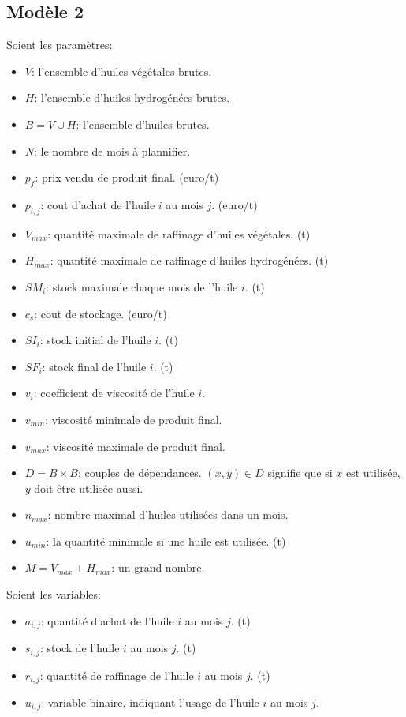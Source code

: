 \documentclass[10pt,a4paper]{article}
\begin{document}
\subsection{Modèle 2}
Soient les paramètres:
\begin{itemize}
    \item $V$: l'ensemble d'huiles végétales brutes.
    \item $H$: l'ensemble d'huiles hydrogénées brutes.
    \item $B = V \cup H$: l'ensemble d'huiles brutes.
    \item $N$: le nombre de mois à plannifier.
    \item $p_f$: prix vendu de produit final. (euro/t)
    \item $p_{i,j}$: cout d'achat de l'huile $i$ au mois $j$. (euro/t)
    \item $V_{max}$: quantité maximale de raffinage d'huiles végétales. (t)
    \item $H_{max}$: quantité maximale de raffinage d'huiles hydrogénées. (t)
    \item $SM_i$: stock maximale chaque mois de l'huile $i$. (t)
    \item $c_s$: cout de stockage. (euro/t)
    \item $SI_i$: stock initial de l'huile $i$. (t)
    \item $SF_i$: stock final de l'huile $i$. (t)
    \item $v_i$: coefficient de viscosité de l'huile $i$.
    \item $v_{min}$: viscosité minimale de produit final.
    \item $v_{max}$: viscosité maximale de produit final.
    \item $D = B \times B$: couples de dépendances. $(x, y) \in D$ signifie que si $x$ est utilisée, $y$ doit être utilisée aussi.
    \item $n_{max}$: nombre maximal d'huiles utilisées dans un mois.
    \item $u_{min}$: la quantité minimale si une huile est utilisée. (t)
    \item $M = V_{max} + H_{max}$: un grand nombre.
\end{itemize}

Soient les variables:
\begin{itemize}
    \item $a_{i,j}$: quantité d'achat de l'huile $i$ au mois $j$. (t)
    \item $s_{i,j}$: stock de l'huile $i$ au mois $j$. (t)
    \item $r_{i,j}$: quantité de raffinage de l'huile $i$ au mois $j$. (t)
    \item $u_{i,j}$: variable binaire, indiquant l'usage de l'huile $i$ au mois $j$.
\end{itemize}
\end{document}
